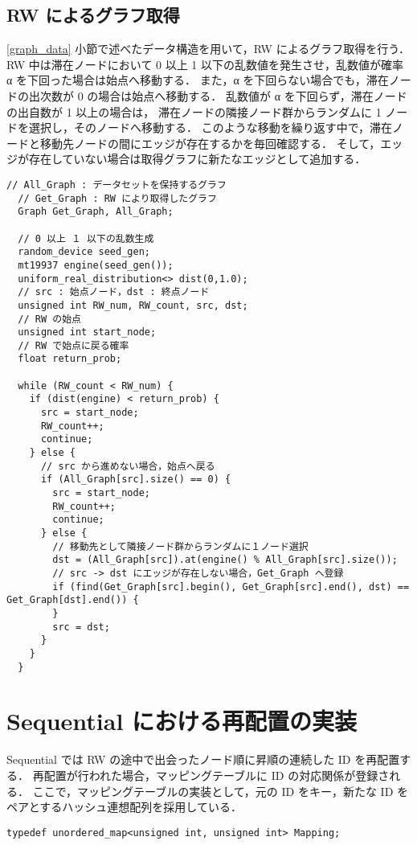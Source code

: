 \subsection{RW によるグラフ取得}
\ref{graph_data} 小節で述べたデータ構造を用いて，RW によるグラフ取得を行う．
RW 中は滞在ノードにおいて 0 以上 1 以下の乱数値を発生させ，乱数値が確率 α を下回った場合は始点へ移動する．
また，α を下回らない場合でも，滞在ノードの出次数が 0 の場合は始点へ移動する．
乱数値が α を下回らず，滞在ノードの出自数が 1 以上の場合は，
滞在ノードの隣接ノード群からランダムに 1 ノードを選択し，そのノードへ移動する．
このような移動を繰り返す中で，滞在ノードと移動先ノードの間にエッジが存在するかを毎回確認する．
そして，エッジが存在していない場合は取得グラフに新たなエッジとして追加する．
\begin{lstlisting}[caption=RW によるグラフ取得, label=rw_graph_get]
  // All_Graph : データセットを保持するグラフ
  // Get_Graph : RW により取得したグラフ
  Graph Get_Graph, All_Graph;

  // 0 以上 １ 以下の乱数生成 
  random_device seed_gen;
  mt19937 engine(seed_gen());
  uniform_real_distribution<> dist(0,1.0);
  // src : 始点ノード，dst : 終点ノード
  unsigned int RW_num, RW_count, src, dst;
  // RW の始点
  unsigned int start_node;
  // RW で始点に戻る確率
  float return_prob;

  while (RW_count < RW_num) {
    if (dist(engine) < return_prob) {
      src = start_node;
      RW_count++;
      continue;
    } else {
      // src から進めない場合，始点へ戻る
      if (All_Graph[src].size() == 0) {
        src = start_node;
        RW_count++;
        continue;
      } else {
        // 移動先として隣接ノード群からランダムに１ノード選択
        dst = (All_Graph[src]).at(engine() % All_Graph[src].size());
        // src -> dst にエッジが存在しない場合，Get_Graph へ登録
        if (find(Get_Graph[src].begin(), Get_Graph[src].end(), dst) == Get_Graph[dst].end()) {
        }
        src = dst;
      }
    }
  }
\end{lstlisting}
\section{Sequential における再配置の実装}
Sequential では RW の途中で出会ったノード順に昇順の連続した ID を再配置する．
再配置が行われた場合，マッピングテーブルに ID の対応関係が登録される．
ここで，マッピングテーブルの実装として，元の ID をキー，新たな ID をペアとするハッシュ連想配列を採用している．
\begin{lstlisting}[caption=マッピングテーブル, label=mapping_table]
  typedef unordered_map<unsigned int, unsigned int> Mapping;
\end{lstlisting}

